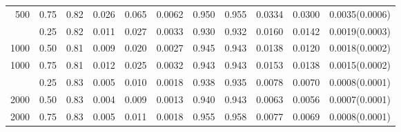 \begin{table}[t]
\begin{tabular}{rr r rr r rr rr r}
500 & 0.75 & 0.82 & 0.026 & 0.065 & 0.0062 & 0.950 & 0.955 & 0.0334 & 0.0300 & 0.0035(0.0006) \\
\addlinespace
1000 & 0.25 & 0.82 & 0.011 & 0.027 & 0.0033 & 0.930 & 0.932 & 0.0160 & 0.0142 & 0.0019(0.0003) \\
1000 & 0.50 & 0.81 & 0.009 & 0.020 & 0.0027 & 0.945 & 0.943 & 0.0138 & 0.0120 & 0.0018(0.0002) \\
1000 & 0.75 & 0.81 & 0.012 & 0.025 & 0.0032 & 0.943 & 0.943 & 0.0153 & 0.0138 & 0.0015(0.0002) \\
\addlinespace
2000 & 0.25 & 0.83 & 0.005 & 0.010 & 0.0018 & 0.938 & 0.935 & 0.0078 & 0.0070 & 0.0008(0.0001) \\
2000 & 0.50 & 0.83 & 0.004 & 0.009 & 0.0013 & 0.940 & 0.943 & 0.0063 & 0.0056 & 0.0007(0.0001) \\
2000 & 0.75 & 0.83 & 0.005 & 0.011 & 0.0018 & 0.955 & 0.958 & 0.0077 & 0.0069 & 0.0008(0.0001) \\
\bottomrule\end{tabular}\end{table}
